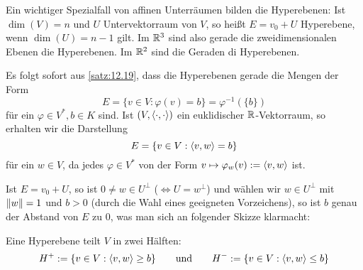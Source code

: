 \begin{bemerkung}
	\label{bem:12.23}
	Ein wichtiger Spezialfall von affinen Unterräumen bilden die Hyperebenen:
	Ist $\dim(V) = n$ und $U$ Untervektorraum von $V$, so heißt $E = v_0 + U$ Hyperebene, wenn $\dim(U) = n-1$ gilt.
	Im $\mathbb{R}^3$ sind also gerade die zweidimensionalen Ebenen die Hyperebenen.
	Im $\mathbb{R}^2$ sind die Geraden di Hyperebenen.
	
	Es folgt sofort aus \autoref{satz:12.19}, dass die Hyperebenen gerade die Mengen der Form
	\[
		E = \{v \in V : \varphi(v) = b\} = \varphi^{-1}(\{b\})
	\]
	für ein $\varphi \in V^*, b \in K$ sind.
	Ist $(V,\left\langle\cdot,\cdot\right\rangle)$ ein euklidischer $\mathbb{R}$-Vektorraum, so erhalten wir die Darstellung
	\[
		E = \{v \in V : \left\langle v,w\right\rangle = b\}
	\]
	für ein $w \in V$, da jedes $\varphi \in V^*$ von der Form $v \mapsto \varphi_w(v) := \left\langle v,w\right\rangle$ ist.
	
	Ist $E = v_0 + U$, so ist $0 \neq w \in U^\perp$ ($\Leftrightarrow U = w^\perp$) und wählen wir $w \in U^\perp$ mit $\left\lVert w\right\rVert=1$ und $b > 0$ (durch die Wahl eines geeigneten Vorzeichens), so ist $b$ genau der Abstand von $E$ zu $0$, was man sich an folgender Skizze klarmacht: 
	
	Eine Hyperebene teilt $V$ in zwei Hälften:
	\[
		H^+ := \{v \in V : \left\langle v,w\right\rangle \geq b\} \qquad \text{und} \qquad H^- := \{v \in V : \left\langle v,w\right\rangle \leq b\}
	\]
\end{bemerkung}
